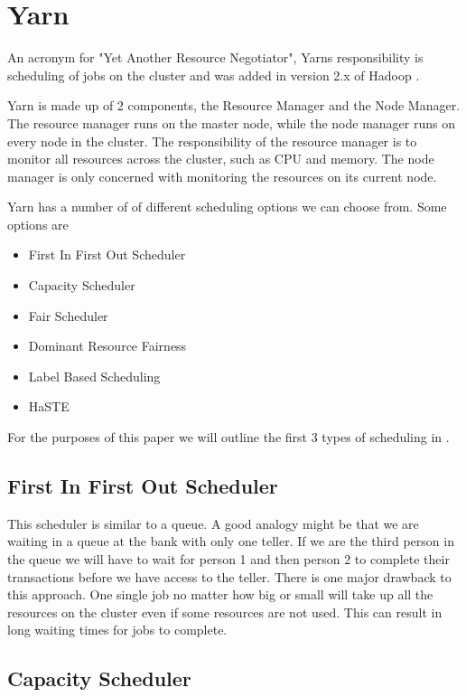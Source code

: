 \section{Yarn}

An acronym for "Yet Another Resource Negotiator", Yarns responsibility is scheduling of jobs on the cluster and was added in version 2.x of Hadoop \cite[pg.1]{yarn-scheduling}.

Yarn is made up of 2 components, the Resource Manager and the Node Manager. The resource manager runs on the master node, while the node manager runs on every node in the cluster. The responsibility of the resource manager is to monitor all resources across the cluster, such as CPU and memory. The node manager is only concerned with monitoring the resources on its current node.

Yarn has a number of of different scheduling options we can choose from. Some options are \cite[pg.2]{yarn-scheduling}

\begin{itemize}
\item First In First Out Scheduler 
\item Capacity Scheduler
\item Fair Scheduler 
\item Dominant Resource Fairness
\item Label Based Scheduling
\item HaSTE
\end{itemize}

For the purposes of this paper we will outline the first 3 types of scheduling in .

\subsection{First In First Out Scheduler}

This scheduler is similar to a queue. A good analogy might be that we are waiting in a queue at the bank with only one teller. If we are the third person in the queue we will have to wait for person 1 and then person 2 to complete their transactions before we have access to the teller. 
There is one major drawback to this approach. One single job no matter how big or small will take up all the resources on the cluster even if some resources are not used. This can result in long waiting times for jobs to complete.

\subsection{Capacity Scheduler}

